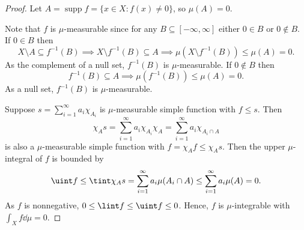 \documentclass[12pt]{article}
\begin{document}
\begin{proof}
    Let $A = \operatorname{supp} f = \{x \in X : f(x) \ne 0\}$, so $\mu(A) = 0$.

    Note that $f$ is $\mu$-measurable since for any $B \subseteq [-\infty, \infty]$ either $0 \in B$ or $0 \notin B$.
    If $0 \in B$ then
    \[
        X \setminus A \subseteq f^{-1}(B) \implies X \setminus f^{-1}(B) \subseteq A \implies \mu(X \setminus f^{-1}(B)) \leq \mu(A) = 0.
    \]
    As the complement of a null set, $f^{-1}(B)$ is $\mu$-measurable.
    If $0 \notin B$ then
    \[
        f^{-1}(B) \subseteq A \implies \mu(f^{-1}(B)) \leq \mu(A) = 0.
    \]
    As a null set, $f^{-1}(B)$ is $\mu$-measurable.

    Suppose $s = \sum_{i=1}^{\infty} a_i \chi_{A_i}$ is $\mu$-measurable simple function with $f \leq s$.
    Then
    \[
        \chi_A s 
            = \sum_{i=1}^{\infty} a_i \chi_{A_i} \chi_A 
            = \sum_{i=1}^{\infty} a_i \chi_{A_i \cap A}
    \]
    is also a $\mu$-measurable simple function with $f = \chi_A f \leq \chi_A s$.
    Then the upper $\mu$-integral of $f$ is bounded by
    \[
        \uint f
            \leq \tint \chi_A s
            = \sum_{i=1}^{\infty} a_i \mu(A_i \cap A)
            \leq \sum_{i=1}^{\infty} a_i \mu(A)
            = 0.
    \]
    As $f$ is nonnegative, $0 \leq \lint f \leq \uint f \leq 0$. Hence, $f$ is $\mu$-integrable with $\int_X f \dd\mu = 0$.
\end{proof}

\begin{corollary}
    
\end{corollary}
\end{document}
